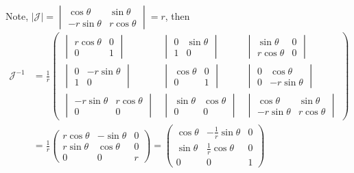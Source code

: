 \documentclass{article}
\begin{document}
Note, $|\mathcal{J}| = \begin{vmatrix}
  \cos \theta&\sin \theta \\
    -r\sin \theta & r\cos \theta  \end{vmatrix} = r$, then
  \begin{align*}
    \mathcal{J}^{-1} &= \frac{1}{r} \begin{pmatrix}
      \begin{vmatrix}r\cos \theta
        &0\\0&1\end{vmatrix}&\begin{vmatrix}0 &\sin
        \theta\\1&0\end{vmatrix} & \begin{vmatrix}\sin \theta  &
        0\\r\cos \theta & 0\end{vmatrix}\\
      \begin{vmatrix}0
        &-r\sin\theta\\1&0\end{vmatrix}& \begin{vmatrix} \cos \theta &
        0 \\0 & 1\end{vmatrix}&\begin{vmatrix}0 &\cos\theta\\0&-r\sin \theta\end{vmatrix} \\
      \begin{vmatrix}-r\sin \theta &r\cos
        \theta\\0&0\end{vmatrix}&\begin{vmatrix}\sin \theta &\cos
        \theta \\0&0\end{vmatrix}&\begin{vmatrix}\cos \theta
        &\sin\theta\\-r\sin \theta &r\cos
        \theta\end{vmatrix}\end{pmatrix}\\
 &=\frac{1}{r}\begin{pmatrix}
      r\cos \theta
      & -\sin
      \theta & 0\\
      r\sin \theta &\cos \theta & 0\\
      0&0&r\end{pmatrix} = \begin{pmatrix}
      \cos \theta
      & -\frac{1}{r}\sin
      \theta & 0\\
      \sin \theta & \frac{1}{r}\cos \theta & 0\\
      0&0&1\end{pmatrix}
\end{align*}
\end{document}
